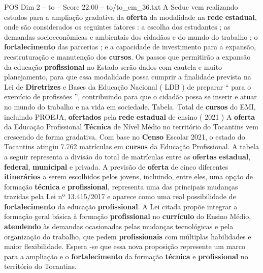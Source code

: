 \begin{textsample}{POS Dim 2 – to – Score 22.00 – to/to\_em\_36.txt}
A Seduc vem realizando estudos para a ampliação gradativa da \textbf{oferta} da modalidade na \textbf{rede} \textbf{estadual}, onde são considerados os seguintes fatores : a escolha dos estudantes ; as demandas socioeconômicas e ambientais dos cidadãos e do mundo do trabalho ; o \textbf{fortalecimento} das parcerias ; e a capacidade de investimento para a expansão, reestruturação e manutenção dos \textbf{cursos}.
Os passos que permitirão a expansão da educação \textbf{profissional} no Estado serão dados com cautela e muito planejamento, para que essa modalidade possa cumprir a finalidade prevista na Lei de \textbf{Diretrizes} e Bases da Educação Nacional ( LDB ) de preparar “ para o exercício de profissões ”, contribuindo para que o cidadão possa se inserir e atuar no mundo do trabalho e na vida em sociedade.
Tabela.
Total de \textbf{cursos} do EMI, incluindo PROEJA, \textbf{ofertados} pela \textbf{rede} \textbf{estadual} de ensino ( 2021 ) A \textbf{oferta} da Educação Profissional \textbf{Técnica} de Nível Médio no território do Tocantins vem crescendo de forma gradativa.
Com base no \textbf{Censo} Escolar 2021, o estado do Tocantins atingiu 7.762 matrículas em \textbf{cursos} da Educação Profissional.
A tabela a seguir representa a divisão do total de matrículas entre as \textbf{ofertas} \textbf{estadual}, \textbf{federal}, \textbf{municipal} e privada.
A previsão de \textbf{oferta} de cinco diferentes \textbf{itinerários} a serem escolhidos pelos jovens, incluindo, entre eles, uma opção de formação \textbf{técnica} e \textbf{profissional}, representa uma das principais mudanças trazidas pela Lei nº 13.415/2017 e aparece como uma real possibilidade de \textbf{fortalecimento} da educação \textbf{profissional}.
A Lei citada propõe integrar a formação geral básica à formação \textbf{profissional} no \textbf{currículo} do Ensino Médio, \textbf{atendendo} às demandas ocasionadas pelas mudanças tecnológicas e pela organização do trabalho, que pedem \textbf{profissionais} com múltiplas habilidades e maior flexibilidade.
Espera -se que essa nova proposição represente um marco para a ampliação e o \textbf{fortalecimento} da formação \textbf{técnica} e \textbf{profissional} no território do Tocantins.

\end{textsample}

